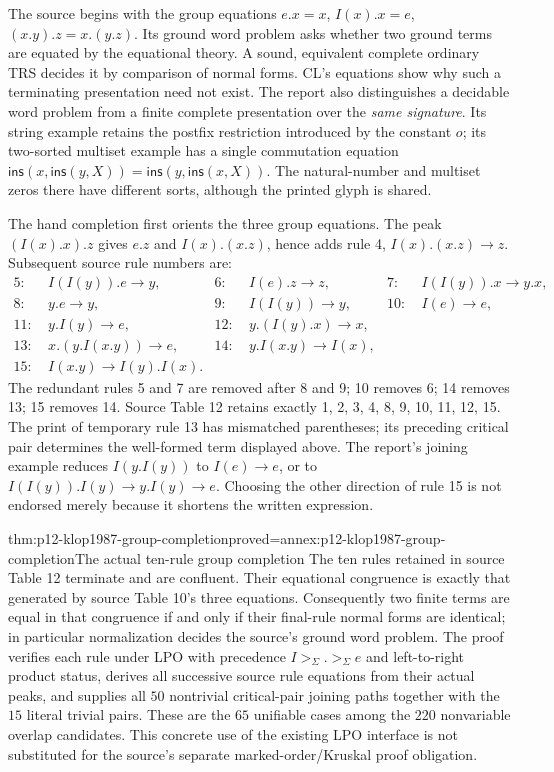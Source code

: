 The source begins with the group equations
\(e.x=x\), \(I(x).x=e\), \((x.y).z=x.(y.z)\).
Its ground word problem asks whether two ground terms are equated by the
equational theory. A sound, equivalent complete ordinary TRS decides it
by comparison of normal forms. CL's equations show why such a terminating
presentation need not exist. The report also distinguishes a decidable word
problem from a finite complete presentation over the \emph{same signature}.
Its string example retains the postfix restriction introduced by the
constant \(o\); its two-sorted multiset example has a single commutation
equation \(\mathsf{ins}(x,\mathsf{ins}(y,X))=
\mathsf{ins}(y,\mathsf{ins}(x,X))\). The natural-number and multiset
zeros there have different sorts, although the printed glyph is shared.

The hand completion first orients the three group equations. The peak
\((I(x).x).z\) gives \(e.z\) and \(I(x).(x.z)\), hence adds
rule 4, \(I(x).(x.z)\to z\). Subsequent source rule numbers are:
\begin{align*}
5:&\ I(I(y)).e\to y,&6:&\ I(e).z\to z,&7:&\ I(I(y)).x\to y.x,\\
8:&\ y.e\to y,&9:&\ I(I(y))\to y,&10:&\ I(e)\to e,\\
11:&\ y.I(y)\to e,&12:&\ y.(I(y).x)\to x,\\
13:&\ x.(y.I(x.y))\to e,&14:&\ y.I(x.y)\to I(x),\\
15:&\ I(x.y)\to I(y).I(x).
\end{align*}
The redundant rules 5 and 7 are removed after 8 and 9; 10 removes 6;
14 removes 13; 15 removes 14. Source Table 12 retains exactly
1, 2, 3, 4, 8, 9, 10, 11, 12, 15. The print of temporary rule 13
has mismatched parentheses; its preceding critical pair determines the
well-formed term displayed above. The report's joining example reduces
\(I(y.I(y))\) to \(I(e)\to e\), or to
\(I(I(y)).I(y)\to y.I(y)\to e\).
Choosing the other direction of rule 15 is not endorsed merely because
it shortens the written expression.

\begin{hbtheorem}{thm:p12-klop1987-group-completion}{proved=annex:p12-klop1987-group-completion}{The actual ten-rule group completion}
The ten rules retained in source Table 12 terminate and are confluent.
Their equational congruence is exactly that generated by source Table
10's three equations. Consequently two finite terms are equal in that
congruence if and only if their final-rule normal forms are identical;
in particular normalization decides the source's ground word problem.
The proof verifies each rule under LPO with precedence
\(I>_\Sigma .>_\Sigma e\) and left-to-right product status,
derives all successive source rule equations from their actual peaks,
and supplies all \(50\) nontrivial critical-pair joining paths together
with the \(15\) literal trivial pairs. These are the \(65\)
unifiable cases among the \(220\) nonvariable overlap candidates.
This concrete use of the existing LPO interface is not substituted for
the source's separate marked-order/Kruskal proof obligation.
\end{hbtheorem}


